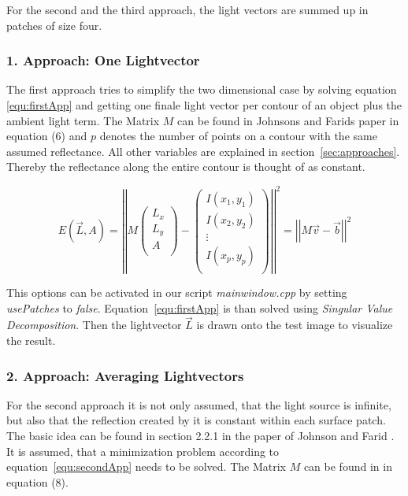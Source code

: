 For the second and the third approach, the light vectors are summed up in patches of size four. 

\subsubsection{1. Approach: One Lightvector}\label{sec:appOne}
The first approach tries to simplify the two dimensional case by solving equation \ref{equ:firstApp} and getting one finale light vector per contour of an object plus the ambient light term. The Matrix $M$ can be found in Johnsons and Farids paper \cite{Johnson} in equation (6) and $p$ denotes the number of points on a contour with the same assumed reflectance. All other variables are explained in section~\ref{sec:approaches}. Thereby the reflectance along the entire contour is thought of as constant. 

\begin{equation}
\label{equ:firstApp}
E(\vec{L} , A) = 
\left\vert \left\vert 
M
\begin{pmatrix}
L_{x} \\
L_{y} \\
A \\
\end{pmatrix} -
\begin{pmatrix}
I(x_{1} , y_{1}) \\
I(x_{2} , y_{2}) \\
\vdots \\
I(x_{p} , y_{p}) \\
\end{pmatrix}
 \right\vert\right\vert^{2}
 = \left\vert \left\vert  M\vec{v}-\vec{b}  \right\vert\right\vert^{2}
\end{equation}

This options can be activated in our script \textit{mainwindow.cpp} by setting \textit{usePatches} to \textit{false}. Equation~\ref{equ:firstApp} is than solved using \textit{Singular Value Decomposition}. Then the lightvector $\vec{L}$ is drawn onto the test image to visualize the result.  

\subsubsection{2. Approach: Averaging Lightvectors}\label{sec:appTwo}
For the second approach it is not only assumed, that the light source is infinite, but also that the reflection created by it is constant within each surface patch. The basic idea can be found in section 2.2.1 in the paper of Johnson and Farid \cite{Johnson}.\\
It is assumed, that a minimization problem according to equation~\ref{equ:secondApp} needs to be solved. The Matrix $M$ can be found in \cite{Johnson} in equation (8). \\

